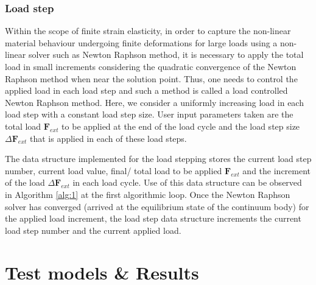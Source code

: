 \documentclass[11pt,a4paper,final]{article}
\begin{document}
\subsubsection{Load step}
Within the scope of finite strain elasticity, in order to capture the non-linear material behaviour undergoing finite deformations for large loads using a non-linear solver such as Newton Raphson method, it is necessary to apply the total load in small increments considering the quadratic convergence of the Newton Raphson method when near the solution point. Thus, one needs to control the applied load in each load step and such a method is called a load controlled Newton Raphson method. Here, we consider a uniformly increasing load in each load step with a constant load step size. User input parameters taken are the total load $\mathbf{F}_{ext}$ to be applied at the end of the load cycle and the load step size $\Delta \mathbf{F}_{ext}$ that is applied in each of these load steps. \par 
The data structure implemented for the load stepping stores the current load step number, current load value, final/ total load to be applied $\mathbf{F}_{ext}$ and the increment of the load $\Delta \mathbf{F}_{ext}$ in each load cycle. Use of this data structure can be observed in Algorithm \eqref{alg:1} at the first algorithmic loop. Once the Newton Raphson solver has converged (arrived at the equilibrium state of the continuum body) for the applied load increment, the load step data structure increments the current load step number and the current applied load.
 
\section{Test models \& Results}



\newpage
\printbibliography
\end{document}
